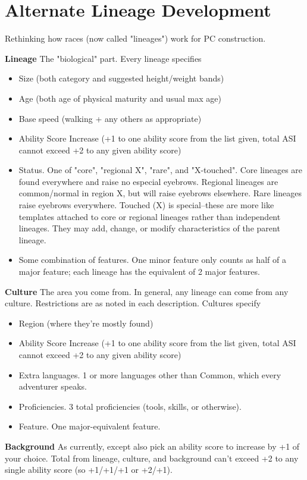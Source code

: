 \chapter{Alternate Lineage Development}\label{ch:Alternate Lineage Construction} 
Rethinking how races (now called "lineages") work for PC construction.

\textbf{Lineage} The "biological" part. Every lineage specifies

\begin{itemize}
\item Size (both category and suggested height/weight bands)
\item Age (both age of physical maturity and usual max age)
\item Base speed (walking + any others as appropriate)
\item Ability Score Increase (+1 to one ability score from the list given, total ASI cannot exceed +2 to any given ability score)
\item Status. One of "core", "regional X", "rare", and "X-touched". Core lineages are found everywhere and raise no especial eyebrows. Regional lineages are common/normal in region X, but will raise eyebrows elsewhere. Rare lineages raise eyebrows everywhere. Touched (X) is special--these are more like templates attached to core or regional lineages rather than independent lineages. They may add, change, or modify characteristics of the parent lineage.
\item Some combination of features. One minor feature only counts as half of a major feature; each lineage has the equivalent of 2 major features.
\end{itemize}

\textbf{Culture} The area you come from. In general, any lineage can come from any culture. Restrictions are as noted in each description. Cultures specify
\begin{itemize}
\item Region (where they're mostly found)
\item Ability Score Increase (+1 to one ability score from the list given, total ASI cannot exceed +2 to any given ability score)
\item Extra languages. 1 or more languages other than Common, which every adventurer speaks.
\item Proficiencies. 3 total proficiencies (tools, skills, or otherwise).
\item Feature. One major-equivalent feature.
\end{itemize}
\textbf{Background} As currently, except also pick an ability score to increase by +1 of your choice. Total from lineage, culture, and background can't exceed +2 to any single ability score (so +1/+1/+1 or +2/+1).

